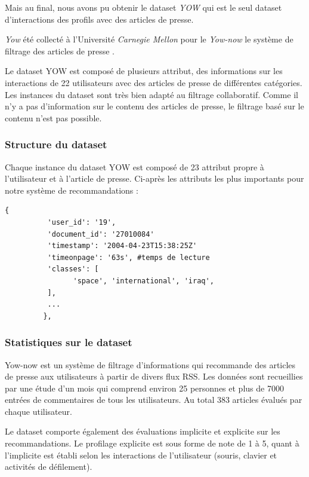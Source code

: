         Mais au final, nous avons pu obtenir le dataset \emph{YOW} qui est le seul dataset d'interactions des profils avec des articles de presse. 

        \emph{Yow} été collecté à l'Université \emph{Carnegie Mellon} pour le \emph{Yow-now} le système de filtrage des articles de presse \cite{carnegieYOW}.

        Le dataset YOW est composé de plusieurs attribut, des informations sur les interactions de 22 utilisateurs avec des articles de presse de différentes catégories. Les instances du dataset sont très bien adapté au filtrage collaboratif. Comme il n'y a pas d'information sur le contenu des articles de presse, le filtrage basé sur le contenu n'est pas possible. 

        \subsubsection{Structure du dataset}
        Chaque instance du dataset YOW est composé de 23 attribut propre à l'utilisateur et à l'article de presse. Ci-après les attributs les plus importants pour notre système de recommandations :  
        \begin{lstlisting}[style=code] 
         {
          'user_id': '19', 
          'document_id': '27010084'
          'timestamp': '2004-04-23T15:38:25Z'
          'timeonpage': '63s', #temps de lecture
          'classes': [
                'space', 'international', 'iraq', 
          ],
          ...
         },
        \end{lstlisting}

        \subsubsection{Statistiques sur le dataset}
        Yow-now est un système de filtrage d'informations qui recommande des articles de presse aux utilisateurs à partir de divers flux RSS. Les données sont recueillies par une étude d'un mois qui comprend environ 25 personnes et plus de 7000 entrées de commentaires de tous les utilisateurs. Au total 383 articles évalués par chaque utilisateur. 

        Le dataset comporte également des évaluations implicite et explicite sur les recommandations. Le profilage explicite est sous forme de note de 1 à 5, quant à l'implicite est établi selon les interactions de l'utilisateur (souris, clavier et activités de défilement).
        

